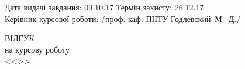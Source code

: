 {\begin{titlepage}
	\vspace*{\fill}

	\noindent
	Дата видачі завдання: 09.10.17 \hfill Термін захисту: 26.12.17 \\
	Керівник курсової роботи: \hfill /проф. каф. ПІІТУ Годлевский~М.~Д./
\end{titlepage}
}

\begin{titlepage}
\begin{center}
	\MakeUppercase{Відгук} \\
	на курсову роботу \\
	<<\thetitle>>
\end{center}
\end{titlepage}

\begin{titlepage}

\end{titlepage}

\begin{titlepage}

\end{titlepage}

\begin{titlepage}

\end{titlepage}
